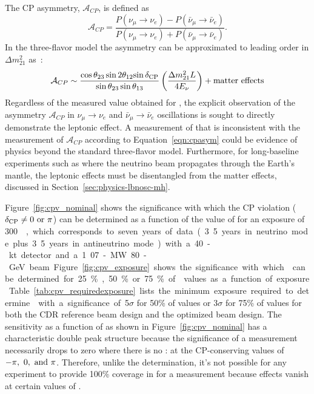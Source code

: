 The CP asymmetry,
$\mathcal{A}_{CP}$, is defined as 
\begin{equation}
\label{eqn:cp-asymm}
 \mathcal{A}_{CP} = \frac{P(\nu_\mu \rightarrow \nu_e) -
  P(\bar{\nu}_\mu \rightarrow \bar{\nu}_e)}{P(\nu_\mu \rightarrow
  \nu_e) + P(\bar{\nu}_\mu \rightarrow \bar{\nu}_e)}.
\end{equation}
In the three-flavor model the asymmetry can be approximated to leading
order in $\Delta m_{21}^2$ as~\cite{Marciano:2006uc}:
\begin{equation}
\mathcal{A}_{CP} \sim \frac{\cos \theta_{23} \sin 2 \theta_{12}
  {\sin \delta_{\rm CP}}}{\sin \theta_{23} \sin \theta_{13}}
\left(\frac{\Delta m^2_{21} L}{ 4 E_{\nu}}\right) + {\rm matter
  \ effects}
\label{eqn:cpasym}
\end{equation}
Regardless of the measured value obtained for \deltacp, the explicit
observation of the asymmetry $\mathcal{A}_{CP}$ in $\nu_{\mu}
\rightarrow \nu_e$ and $\bar{\nu}_{\mu} \rightarrow
\bar{\nu}_e$ oscillations is sought to directly demonstrate the
leptonic  effect.  A measurement of \deltacp that is
inconsistent with the measurement of $\mathcal{A}_{CP}$ according to
Equation~\ref{eqn:cpasym} could be evidence of physics beyond the
standard three-flavor model.  Furthermore, for long-baseline
experiments such as  where the neutrino beam propagates through
the Earth's mantle, the leptonic  effects must be
disentangled from the matter effects, discussed in
Section~\ref{sec:physics-lbnosc-mh}.

Figure~\ref{fig:cpv_nominal} shows the significance with which the CP
violation ($\delta_{\rm CP} \neq 0 \ {\rm or} \ \pi$) can be determined as a
function of the value of \deltacp for an exposure of \SI{300}~\ktMWyr,
which corresponds to seven years of data (3.5 years in neutrino mode
plus 3.5 years in antineutrino mode) with a 40-kt detector and a
1.07-MW 80-GeV beam.  Figure~\ref{fig:cpv_exposure} shows the significance
with which  can be determined for 25\%, 50\% or 75\% of \deltacp
values as a function of exposure.
Table~\ref{tab:cpv_requiredexposure} lists the minimum exposure
required to determine  with a significance of 5$\sigma$
for 50\% of \deltacp values or 3$\sigma$ for 75\% of \deltacp values
for both the CDR reference beam design and the optimized beam design.
The  sensitivity as a function of \deltacp as shown in
Figure~\ref{fig:cpv_nominal} has a characteristic double peak
structure because the significance of a  measurement
necessarily drops to zero where there is no : at the
CP-conserving values of $-\pi,~0,~{\rm and}~\pi$.  Therefore, unlike
the  determination, it's not possible for any experiment to provide
100\% coverage in \deltacp for a  measurement because  effects vanish at certain values of \deltacp.


